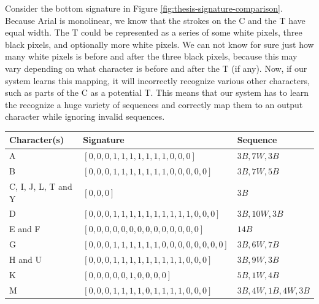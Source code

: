 Consider the bottom signature in Figure \ref{fig:thesis-signature-comparison}. Because Arial is monolinear, we know that the strokes on the C and the T have equal width. The T could be represented as a series of some white pixels, three black pixels, and optionally more white pixels. We can not know for sure just how many white pixels is before and after the three black pixels, because this may vary depending on what character is before and after the T (if any). Now, if our system learns this mapping, it will incorrectly recognize various other characters, such as parts of the C as a potential T. This means that our system has to learn the recognize a huge variety of sequences and correctly map them to an output character while ignoring invalid sequences.

\begin{table}[ht]
    \centering
    \begin{tabular}{|l|l|l|}
        \hline 
        \textbf{Character(s)} & \textbf{Signature}                                    & \textbf{Sequence}            \\ \hline
        A                     & \([0, 0, 0, 1, 1, 1, 1, 1, 1, 1, 0, 0, 0]\)             & \(3B, 7W, 3B\)                 \\ \hline
        B                     & \([0, 0, 0, 1, 1, 1, 1, 1, 1, 1, 0, 0, 0, 0, 0]\)       & \(3B, 7W, 5B\)                 \\ \hline
        C, I, J, L, T and Y   & \([0, 0, 0]\)                                           & \(3B\)                         \\ \hline
        D                     & \([0, 0, 0, 1, 1, 1, 1, 1, 1, 1, 1, 1, 1, 0, 0, 0]\)    & \(3B, 10W, 3B\)                \\ \hline
        E and F               & \([0, 0, 0, 0, 0, 0, 0, 0, 0, 0, 0, 0, 0, 0]\)          & \(14B\)                        \\ \hline
        G                     & \([0, 0, 0, 1, 1, 1, 1, 1, 1, 0, 0, 0, 0, 0, 0, 0, 0]\) & \(3B, 6W, 7B\)                 \\ \hline
        H and U               & \([0, 0, 0, 1, 1, 1, 1, 1, 1, 1, 1, 1, 0, 0, 0]\)       & \(3B, 9W, 3B\)                 \\ \hline
        K                     & \([0, 0, 0, 0, 0, 1, 0, 0, 0, 0]\)                      & \(5B, 1W, 4B\)                 \\ \hline
        M                     & \([0, 0, 0, 1, 1, 1, 1, 0, 1, 1, 1, 1, 0, 0, 0]\)       & \(3B, 4W, 1B, 4W, 3B\)         \\ \hline

\end{tabular}
\end{table}
